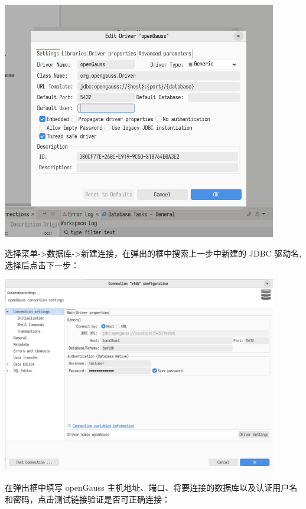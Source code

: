 \documentclass{article}
\begin{document}
\begin{center}
\includegraphics[width=12cm]{./image/2.png}
\end{center}

选择菜单->数据库->新建连接，在弹出的框中搜索上一步中新建的 JDBC 驱动名,选择后点击下一步：

\begin{center}
\includegraphics[width=12cm]{./image/4.png}
\end{center}

在弹出框中填写 openGauss 主机地址、端口、将要连接的数据库以及认证用户名和密码，点击测试链接验证是否可正确连接：
\end{document}
